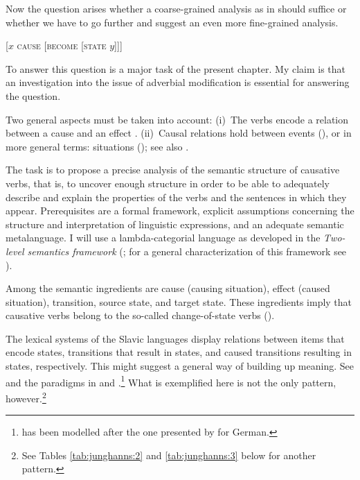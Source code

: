 \documentclass[output=paper]{langscibook}
\begin{document}
Now the question arises whether a coarse-grained analysis as in  should suffice or whether we have to go further and suggest an even more fine-grained analysis.

\ea%
    \label{ex:junghanns:7}
 [$x$ \textsc{cause} [\textsc{become} [\textsc{state} $y$]]]
\z

\noindent To answer this question is a major task of the present chapter. My claim is that an investigation into the issue of adverbial modification is essential for answering the question.

Two general aspects must be taken into account: (i)~The verbs encode a relation between a cause and an effect \citep{Bierwisch2005}. (ii)~Causal relations hold between events  (\citealt{Davidson1967b,Lewis1973}), or in more general terms: situations (\citealt{BarwisePerry1983}); see also \citet{McCawley1976}.

The task is to propose a precise analysis of the semantic structure of causative verbs, that is, to uncover enough structure in order to be able to adequately describe and explain the properties of the verbs and the sentences in which they appear. Prerequisites are a formal framework, explicit assumptions concerning the structure and interpretation of linguistic expressions, and an adequate semantic metalanguage. I will use a lambda-categorial language as developed in the \textit{Two-level semantics framework} (\citealt{Bierwisch1982,Bierwisch1986nature,Bierwisch2007}; for a general characterization of this framework see \citealt{Lang-Maienborn2011}).

Among the semantic ingredients are cause (causing situation), effect (caused situation), transition, source state, and target state. These ingredients imply that causative verbs belong to the so-called change-of-state verbs (\citealt{Dowty1979,Fabricius-Hansen1991,RappaportLevin2005}).

\largerpage
The lexical systems of the Slavic languages display relations between items that encode states, transitions that result in states, and caused transitions resulting in states, respectively. This might suggest a general way of building up meaning. See  and the paradigms in  and .\footnote{ has been modelled after the one presented by \citet[43]{Bierwisch2005} for German.} What is exemplified here is not the only pattern, however.\footnote{See Tables \ref{tab:junghanns:2} and \ref{tab:junghanns:3} below for another pattern.}
\end{document}
